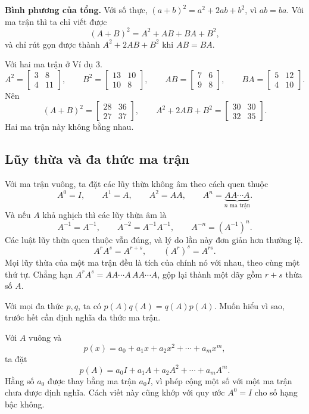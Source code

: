 \documentclass[12pt,a4paper]{article}
\begin{document}
\textbf{Bình phương của tổng.} Với số thực, \((a+b)^2=a^2+2ab+b^2\), vì \(ab=ba\). Với ma trận thì ta chỉ viết được
$$
(A+B)^2=A^2+AB+BA+B^2,
$$
và chỉ rút gọn được thành \(A^2+2AB+B^2\) khi \(AB=BA\).

Với hai ma trận ở Ví dụ 3.
$$
A^2=\left[ \begin{array}{rr} 3 & 8\\ 4 & 11 \end{array} \right],\qquad
B^2=\left[ \begin{array}{rr} 13 & 10\\ 10 & 8 \end{array} \right],\qquad
AB=\left[ \begin{array}{rr} 7 & 6\\ 9 & 8 \end{array} \right],\qquad
BA=\left[ \begin{array}{rr} 5 & 12\\ 4 & 10 \end{array} \right].
$$
Nên
$$
(A+B)^2=\left[ \begin{array}{rr} 28 & 36\\ 27 & 37 \end{array} \right],\qquad
A^2+2AB+B^2=\left[ \begin{array}{rr} 30 & 30\\ 32 & 35 \end{array} \right].
$$
Hai ma trận này không bằng nhau.

\subsection{Lũy thừa và đa thức ma trận}

Với ma trận vuông, ta đặt các lũy thừa không âm theo cách quen thuộc
$$
A^0=I,\qquad A^1=A,\qquad A^2=AA,\qquad A^n=\underbrace{AA\cdots A}_{n\text{ ma trận}}.
$$
Và nếu \(A\) khả nghịch thì các lũy thừa âm là
$$
A^{-1}=A^{-1},\qquad A^{-2}=A^{-1}A^{-1},\qquad A^{-n}=\left(A^{-1}\right)^n.
$$
Các luật lũy thừa quen thuộc vẫn đúng, và lý do lần này đơn giản hơn thường lệ.
$$
A^{r}A^{s}=A^{r+s},\qquad (A^{r})^{s}=A^{rs}. \tag{7}
$$
Mọi lũy thừa của một ma trận đều là tích của chính nó với nhau, theo cùng một thứ tự. Chẳng hạn \(A^rA^s=AA\cdots A\,AA\cdots A\), gộp lại thành một dãy gồm \(r+s\) thừa số \(A\).

Với mọi đa thức \(p,q\), ta có \(p(A)q(A)=q(A)p(A)\). Muốn hiểu vì sao, trước hết cần định nghĩa đa thức ma trận.

Với \(A\) vuông và
$$
p(x)=a_0+a_1x+a_2x^2+\cdots+a_mx^m,
$$
ta đặt
$$
p(A)=a_0I+a_1A+a_2A^2+\cdots+a_mA^m. \tag{8}
$$
Hằng số \(a_0\) được thay bằng ma trận \(a_0I\), vì phép cộng một số với một ma trận chưa được định nghĩa. Cách viết này cũng khớp với quy ước \(A^0=I\) cho số hạng bậc không.
\end{document}
